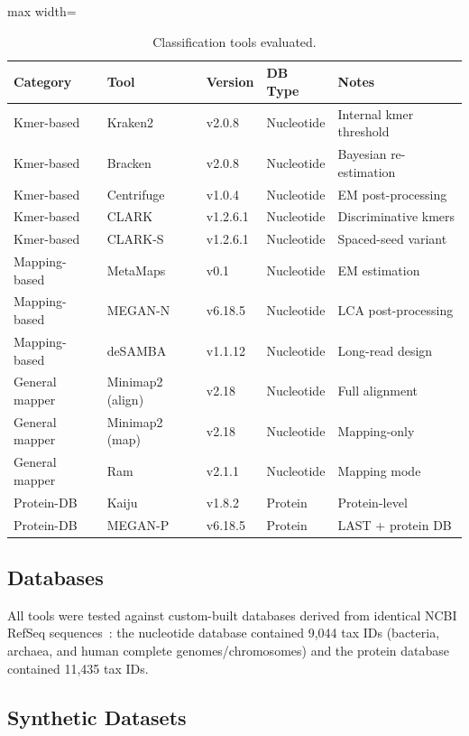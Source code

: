 \documentclass[11pt]{article}
\begin{document}
\begin{table}[ht]
\centering
\caption{Classification tools evaluated.}
\label{tab:tools}
\begin{adjustbox}{max width=\textwidth}
\begin{tabular}{@{}lllll@{}}
\toprule
Category & Tool & Version & DB Type & Notes \\
\midrule
Kmer-based & Kraken2 & v2.0.8 & Nucleotide & Internal kmer threshold \\
Kmer-based & Bracken & v2.0.8 & Nucleotide & Bayesian re-estimation \\
Kmer-based & Centrifuge & v1.0.4 & Nucleotide & EM post-processing \\
Kmer-based & CLARK & v1.2.6.1 & Nucleotide & Discriminative kmers \\
Kmer-based & CLARK-S & v1.2.6.1 & Nucleotide & Spaced-seed variant \\
Mapping-based & MetaMaps & v0.1 & Nucleotide & EM estimation \\
Mapping-based & MEGAN-N & v6.18.5 & Nucleotide & LCA post-processing \\
Mapping-based & deSAMBA & v1.1.12 & Nucleotide & Long-read design \\
General mapper & Minimap2 (align) & v2.18 & Nucleotide & Full alignment \\
General mapper & Minimap2 (map) & v2.18 & Nucleotide & Mapping-only \\
General mapper & Ram & v2.1.1 & Nucleotide & Mapping mode \\
Protein-DB & Kaiju & v1.8.2 & Protein & Protein-level \\
Protein-DB & MEGAN-P & v6.18.5 & Protein & LAST + protein DB \\
\bottomrule
\end{tabular}
\end{adjustbox}
\end{table}

\subsection{Databases}

All tools were tested against custom-built databases derived from identical NCBI RefSeq sequences~\citep{ncbi2021refseq}: the nucleotide database contained 9,044 tax IDs (bacteria, archaea, and human complete genomes/chromosomes) and the protein database contained 11,435 tax IDs.

\subsection{Synthetic Datasets}
\end{document}
